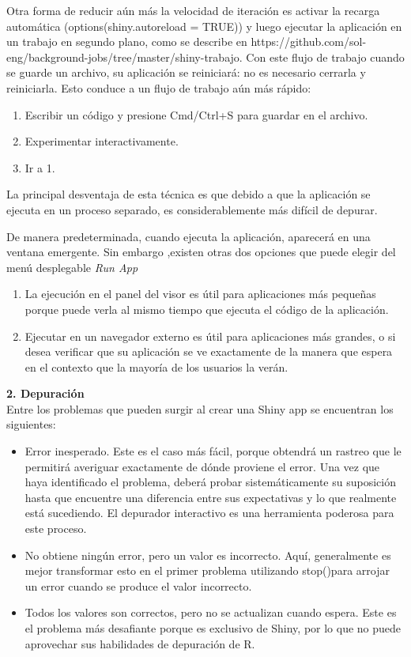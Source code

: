 Otra forma de reducir aún más la velocidad de iteración es activar la recarga automática (options(shiny.autoreload = TRUE)) y luego ejecutar la aplicación en un trabajo en segundo plano, como se describe en https://github.com/sol-eng/background-jobs/tree/master/shiny-trabajo. Con este flujo de trabajo cuando se guarde un archivo, su aplicación se reiniciará: no es necesario cerrarla y reiniciarla. Esto conduce a un flujo de trabajo aún más rápido:
\begin{enumerate}
\item Escribir un código y presione Cmd/Ctrl+S para guardar en el archivo.
\item Experimentar interactivamente.
\item Ir a 1.
\end{enumerate}
La principal desventaja de esta técnica es que debido a que la aplicación se ejecuta en un proceso separado, es considerablemente más difícil de depurar.

De manera predeterminada, cuando ejecuta la aplicación, aparecerá en una ventana emergente. Sin embargo ,existen otras dos opciones que puede elegir del menú desplegable \emph{Run App}
\begin{enumerate}
\item La ejecución en el panel del visor es útil para aplicaciones más pequeñas porque puede verla al mismo tiempo que ejecuta el código de la aplicación.
\item Ejecutar en un navegador externo es útil para aplicaciones más grandes, o si desea verificar que su aplicación se ve exactamente de la manera que espera en el contexto que la mayoría de los usuarios la verán.
\end{enumerate}


\textbf{2.\hspace{1cm} Depuración}\\


Entre los problemas que pueden surgir al crear una Shiny app se encuentran los siguientes:

\begin{itemize}
\item Error inesperado. Este es el caso más fácil, porque obtendrá un rastreo que le permitirá averiguar exactamente de dónde proviene el error. Una vez que haya identificado el problema, deberá probar sistemáticamente su suposición hasta que encuentre una diferencia entre sus expectativas y lo que realmente está sucediendo. El depurador interactivo es una herramienta poderosa para este proceso.
\item No obtiene ningún error, pero un valor es incorrecto. Aquí, generalmente es mejor transformar esto en el primer problema utilizando stop()para arrojar un error cuando se produce el valor incorrecto.
\item Todos los valores son correctos, pero no se actualizan cuando espera. Este es el problema más desafiante porque es exclusivo de Shiny, por lo que no puede aprovechar sus habilidades de depuración de R.

\end{itemize}


